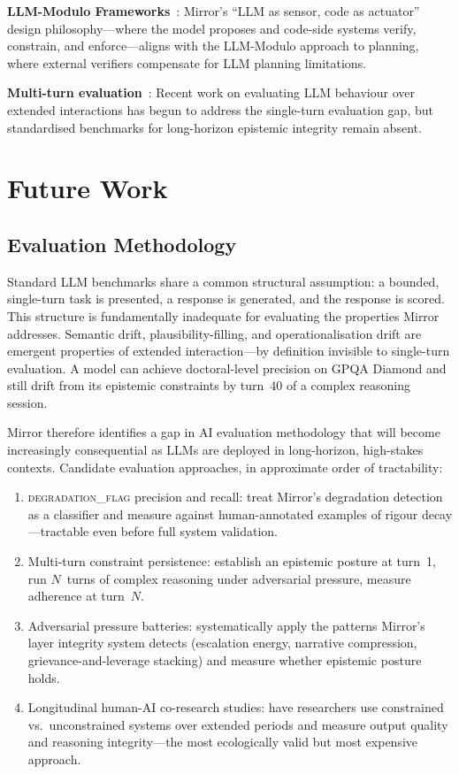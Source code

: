 \documentclass[11pt,a4paper]{article}
\begin{document}
\textbf{LLM-Modulo Frameworks}~\citep{kambhampati2024llmcantplan}: Mirror's ``LLM as sensor, code as actuator'' design philosophy---where the model proposes and code-side systems verify, constrain, and enforce---aligns with the LLM-Modulo approach to planning, where external verifiers compensate for LLM planning limitations.

\textbf{Multi-turn evaluation}~\citep{zheng2023judging}: Recent work on evaluating LLM behaviour over extended interactions has begun to address the single-turn evaluation gap, but standardised benchmarks for long-horizon epistemic integrity remain absent.

\section{Future Work}
\label{sec:future}

\subsection{Evaluation Methodology}

Standard LLM benchmarks share a common structural assumption: a bounded, single-turn task is presented, a response is generated, and the response is scored.
This structure is fundamentally inadequate for evaluating the properties Mirror addresses.
Semantic drift, plausibility-filling, and operationalisation drift are emergent properties of extended interaction---by definition invisible to single-turn evaluation.
A model can achieve doctoral-level precision on GPQA Diamond and still drift from its epistemic constraints by turn~40 of a complex reasoning session.

Mirror therefore identifies a gap in AI evaluation methodology that will become increasingly consequential as LLMs are deployed in long-horizon, high-stakes contexts.
Candidate evaluation approaches, in approximate order of tractability:
\begin{enumerate}[leftmargin=2em]
    \item \textsc{degradation\_flag} precision and recall: treat Mirror's degradation detection as a classifier and measure against human-annotated examples of rigour decay---tractable even before full system validation.
    \item Multi-turn constraint persistence: establish an epistemic posture at turn~1, run $N$~turns of complex reasoning under adversarial pressure, measure adherence at turn~$N$.
    \item Adversarial pressure batteries: systematically apply the patterns Mirror's layer integrity system detects (escalation energy, narrative compression, grievance-and-leverage stacking) and measure whether epistemic posture holds.
    \item Longitudinal human-AI co-research studies: have researchers use constrained vs.\ unconstrained systems over extended periods and measure output quality and reasoning integrity---the most ecologically valid but most expensive approach.
\end{enumerate}
\end{document}
